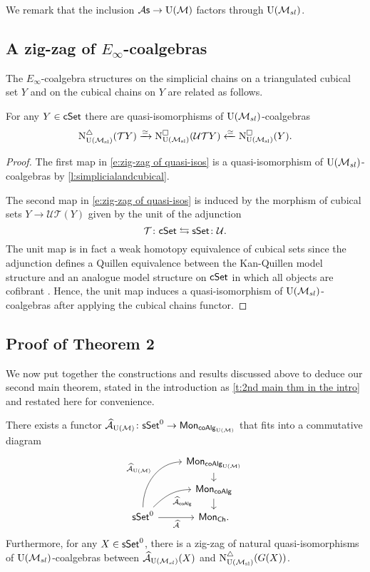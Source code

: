 We remark that the inclusion ${\mathcal{A}\mathsf{s}} \to {\operatorname{U}(\mathcal{M})}$ factors through ${\operatorname{U}(\mathcal{M}_{sl})}$.

\subsection{A zig-zag of $E_\infty$-coalgebras}
The $E_{\infty}$-coalgebra structures on the simplicial chains on a triangulated cubical set $Y$ and on the cubical chains on $Y$ are related as follows. 
\begin{proposition} \label{p:zigzag} 
For any  $Y \in \mathsf{cSet}$ there are quasi-isomorphisms of ${\operatorname{U}(\mathcal{M}_{sl})}$-coalgebras
	\begin{equation} \label{e:zig-zag of quasi-isos}
	\operatorname{N^{\triangle}_{{\operatorname{U}(\mathcal{M}_{sl})}}}(\mathcal{T}Y) \xrightarrow{\simeq}
	\operatorname{N^{\square}_{{\operatorname{U}(\mathcal{M}_{sl})}}}(\mathcal{U}\mathcal{T}Y) \xleftarrow{\simeq}
	\operatorname{N^{\square}_{{\operatorname{U}(\mathcal{M}_{sl})}}}(Y).
	\end{equation}	
	\end{proposition}
	\begin{proof}
	The first map in \eqref{e:zig-zag of quasi-isos} is a quasi-isomorphism of ${\operatorname{U}(\mathcal{M}_{sl})}$-coalgebras by \cref{l:simplicialandcubical}.
	
	The second map in \eqref{e:zig-zag of quasi-isos} is induced by the morphism of cubical sets $Y \to \mathcal{U} \mathcal{T} (Y)$ given by the unit of the adjunction
	$$\mathcal{T} \colon \mathsf{cSet} \leftrightarrows \mathsf{sSet} \colon \mathcal{U}.$$
	The unit map is in fact a weak homotopy equivalence of cubical sets since the adjunction defines a Quillen equivalence between the Kan-Quillen model structure and an analogue model structure on $\mathsf{cSet}$ in which all objects are cofibrant \cite{cisinski2006presheaves}.
	Hence, the unit map induces a quasi-isomorphism of ${\operatorname{U}(\mathcal{M}_{sl})}$-coalgebras after applying the cubical chains functor. 
	\end{proof}

\subsection{Proof of Theorem 2}

We now put together the constructions and results discussed above to deduce our second main theorem, stated in the introduction as \cref{t:2nd main thm in the intro} and restated here for convenience.

\begin{nntheorem}
	There exists a functor $\operatorname{\mathcal{\widehat{A}}}_{\operatorname{U}(\mathcal{M})} \colon \mathsf{sSet}^0 \to \mathsf{Mon}_{\mathsf{coAlg}_{\operatorname{U}(\mathcal{M})}}$ that fits into a commutative diagram
	\begin{equation*}
	\begin{tikzcd}[row sep=small]
	& \Mon_{\coAlg_\UM} \arrow[d] \\
	& \Mon_{\coAlg} \arrow[d] \\
	\sSet^0
	\arrow[r, "\Ahat"', ]
	\arrow[ru, "\Ahat_{\coAlg}"', out=45, in=180] 
	\arrow[ruu, "\Ahat_\UM", out=90, in=180]
	& \Mon_{\Ch}.
	\end{tikzcd}
	\end{equation*}
	Furthermore, for any $X \in \mathsf{sSet}^0$, there is a zig-zag of natural quasi-isomorphisms of ${\operatorname{U}(\mathcal{M}_{sl})}$-coalgebras between $\operatorname{\mathcal{\widehat{A}}}_{\operatorname{U}(\mathcal{M}_{sl})}(X)$ and $\operatorname{N^{\triangle}_{{\operatorname{U}(\mathcal{M}_{sl})}}}(G(X))$.
\end{nntheorem}

